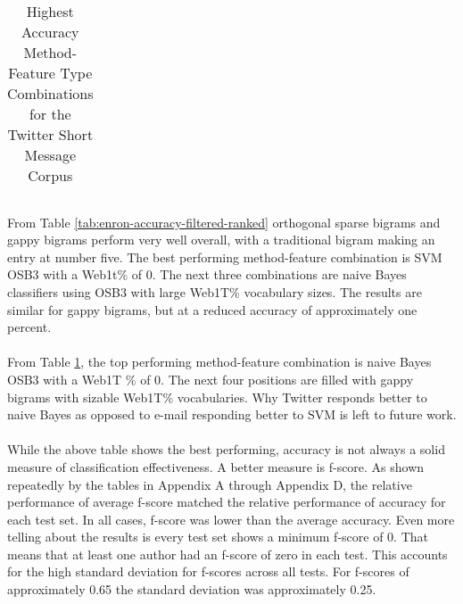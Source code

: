 \begin{table}[htbp!]
\begin{center}
\begin{tabular}{ | r | r | r | r | r | r | r | }
			\end{tabular}
		\caption{Highest Accuracy Method-Feature Type Combinations for the Twitter Short Message Corpus}
		\label{tab:twitter-accuracy-filtered-ranked}
		\end{center}	
	\end{table}
	
	
	\paragraph*{} From Table \ref{tab:enron-accuracy-filtered-ranked} orthogonal sparse bigrams and gappy bigrams perform very well overall, with a traditional bigram making an entry at number five.  The best performing method-feature combination is SVM OSB3 with a Web1t\% of 0.  The next three combinations are naive Bayes classifiers using OSB3 with large Web1T\% vocabulary sizes.  The results are similar for gappy bigrams, but at a reduced accuracy of approximately one percent.
	
	\paragraph*{} From Table \ref{tab:twitter-accuracy-filtered-ranked}, the top performing method-feature combination is naive Bayes OSB3 with a Web1T \% of 0.  The next four positions are filled with gappy bigrams with sizable Web1T\% vocabularies.  Why Twitter responds better to naive Bayes as opposed to e-mail responding better to SVM is left to future work.
	
	\paragraph*{} While the above table shows the best performing, accuracy is not always a solid measure of classification effectiveness.  A better measure is f-score.  As shown repeatedly by the tables in Appendix A through Appendix D, the relative performance of average f-score matched the relative performance of accuracy for each test set.  In all cases, f-score was lower than the average accuracy.  Even more telling about the results is every test set shows a minimum f-score of 0.  That means that at least one author had an f-score of zero in each test.  This accounts for the high standard deviation for f-scores across all tests.  For f-scores of approximately 0.65 the standard deviation was approximately 0.25.
	
